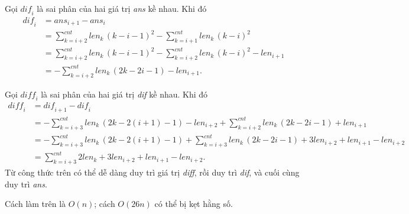 \documentclass[11pt]{article}
\begin{document}
Gọi $\textit{dif}_i$ là sai phân của hai giá trị \textit{ans} kề nhau. Khi đó
\[
\begin{aligned}
  \textit{dif}_i
  &= \textit{ans}_{i+1}-\textit{ans}_i \\
  &= \sum_{k=i+2}^{\textit{cnt}}\textit{len}_k\,(k-i-1)^2
     -
     \sum_{k=i+1}^{\textit{cnt}}\textit{len}_k\,(k-i)^2 \\
  &= \sum_{k=i+2}^{\textit{cnt}}\textit{len}_k\,(k-i-1)^2
     -
     \sum_{k=i+2}^{\textit{cnt}}\textit{len}_k\,(k-i)^2
     -\textit{len}_{i+1} \\
  &= -\sum_{k=i+2}^{\textit{cnt}}\textit{len}_k\,(2k-2i-1)
     -\textit{len}_{i+1}.
\end{aligned}
\]

Gọi $\textit{diff}_i$ là sai phân của hai giá trị \textit{dif} kề nhau. Khi đó
\[
\begin{aligned}
  \textit{diff}_i
  &= \textit{dif}_{i+1}-\textit{dif}_i \\
  &= -\sum_{k=i+3}^{\textit{cnt}}\textit{len}_k\,(2k-2(i+1)-1)
     -\textit{len}_{i+2}
     +\sum_{k=i+2}^{\textit{cnt}}\textit{len}_k\,(2k-2i-1)
     +\textit{len}_{i+1} \\
  &= -\sum_{k=i+3}^{\textit{cnt}}\textit{len}_k\,(2k-2(i+1)-1)
     +\sum_{k=i+3}^{\textit{cnt}}\textit{len}_k\,(2k-2i-1)
     +3\textit{len}_{i+2}
     +\textit{len}_{i+1}
     -\textit{len}_{i+2} \\
  &= \sum_{k=i+3}^{\textit{cnt}}2\textit{len}_k
     +3\textit{len}_{i+2}
     +\textit{len}_{i+1}
     -\textit{len}_{i+2}.
\end{aligned}
\]
Từ công thức trên có thể dễ dàng duy trì giá trị \textit{diff}, rồi duy trì
\textit{dif}, và cuối cùng duy trì \textit{ans}.

Cách làm trên là $O(n)$; cách $O(26n)$ có thể bị kẹt hằng số.
\end{document}

